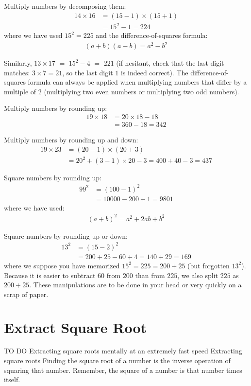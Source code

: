 \documentclass[12pt]{article}
\begin{document}
Multiply numbers by decomposing them:
\begin{align*}
14 \times 16
 & = (15-1) \times (15+1) \\
 & = 15^2 -1 = 224
\end{align*}
where we have used $15^2=225$ and the difference-of-squares formula:
\begin{align*}
(a+b) (a-b) = a^2 - b^2
\end{align*}

Similarly, $13 \times 17$ $=$ $15^2 -4$ $=$ $221$ (if hesitant, check that the last digit matches: $3\times7=21$, so the last digit $1$ is indeed correct).
The difference-of-squares formula can always be applied when multiplying numbers that differ by a multiple of $2$ (multiplying two even numbers or multiplying two odd numbers). 

Multiply numbers by rounding up:
\begin{align*}
19 \times 18
 & = 20 \times 18 - 18\\
 & = 360 - 18 = 342
\end{align*}

Multiply numbers by rounding up and down:
\begin{align*}
19 \times 23
 & = (20-1) \times (20+3) \\
 & = 20^2 + (3-1) \times 20 -3 = 400 + 40 - 3 = 437
\end{align*}

Square numbers by rounding up:
\begin{align*}
99^2 
 & = (100-1)^2 \\
 & = 10000 - 200 + 1 = 9801
\end{align*}
where we have used:
\begin{align*}
(a + b)^2 = a^2 + 2ab + b^2
\end{align*}

Square numbers by rounding up or down:
\begin{align*}
13^2 
 & = (15-2)^2 \\
 & = 200 + 25 - 60 + 4 = 140 + 29 = 169
\end{align*}
where we suppose you have memorized $15^2=225=200+25$ (but forgotten $13^2$). Because it is easier to subtract $60$ from $200$ than from $225$, we also split $225$ as $200+25$. These manipulations are to be done in your head or very quickly on a scrap of paper. 


\section*{Extract Square Root}
TO DO
 Extracting square roots mentally at an extremely fast speed
Extracting square roots
Finding the square root of a number is the inverse operation of squaring that number. Remember, the square of a number is that number times itself.
 
\end{document}
